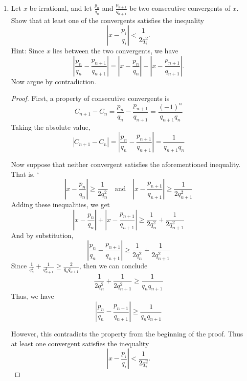 \documentclass[11pt]{article}
\theoremstyle{definition}
\begin{document}
\begin{enumerate}
\begin{enumerate}
\begin{proof}
            So, one solution is $(x_2, y_2) = (449,120)$

            For $n=3$:
            \begin{align*}
                (15+4\sqrt{14})^3 &= (449 + 120\sqrt{14})(15+4\sqrt{14}) \\
                &= 6735 + 3596\sqrt{14} + 6720 \\
                &= 13455 + 3596\sqrt{14}
            \end{align*}
            So, another solution is $(x_3, y_3) = (13455,3596)$
        \end{proof}
    
    \end{enumerate}
    \item Let $x$ be irrational, and let $\frac{p_n}{q_n}$ and $\frac{p_{n+1}}{q_{n+1}}$ be two consecutive convergents of $x$. Show that at least one of the convergents satisfies the inequality
    $$ \left\lvert x - \frac{p_i}{q_i} \right\rvert < \frac{1}{2q_i^2}. $$ Hint: Since $x$ lies between the two convergents, we have $$\left\lvert \frac{p_n}{q_n} - \frac{p_{n+1}}{q_{n+1}} \right\rvert = \left\lvert x - \frac{p_n}{q_n} \right\rvert + \left\lvert x - \frac{p_{n+1}}{q_{n+1}} \right\rvert.$$ Now argue by contradiction.
    \begin{proof}
        First, a property of consecutive convergents is 
        \[
            C_{n+1} - C_n = \frac{p_n}{q_n} - \frac{p_{n+1}}{q_{n+1}} = \frac{(-1)^n}{q_{n+1}q_n}
        \]
        Taking the absolute value, 
        \[
            \left\lvert C_{n+1} - C_n \right\rvert = \left\lvert \frac{p_n}{q_n} - \frac{p_{n+1}}{q_{n+1}} \right\rvert = \frac{1}{q_{n+1}q_n}
        \]

        Now suppose that neither convergent satisfies the aforementioned inequality. That is, 
    `   \[
            \left\lvert x - \frac{p_n}{q_n} \right\rvert \ge \frac{1}{2q_n^2} \quad\text{and}\quad \left\lvert x - \frac{p_{n+1}}{q_{n+1}} \right\rvert \ge \frac{1}{2q_{n+1}^2}
        \]
        Adding these inequalities, we get 
        \[
            \left\lvert x - \frac{p_n}{q_n} \right\rvert + \left\lvert x - \frac{p_{n+1}}{q_{n+1}} \right\rvert \ge \frac{1}{2q_n^2} + \frac{1}{2q_{n+1}^2} 
        \]
        And by substitution, 
        \[
            \left\lvert \frac{p_n}{q_n} - \frac{p_{n+1}}{q_{n+1}} \right\rvert \ge \frac{1}{2q_n^2} + \frac{1}{2q_{n+1}^2}
        \]
        Since $\frac{1}{q_n^2} + \frac{1}{q_{n+1}^2} \ge \frac{2}{q_nq_{n+1}}$, then we can conclude
        \[
            \frac{1}{2q_n^2} + \frac{1}{2q_{n+1}^2} \ge \frac{1}{q_nq_{n+1}}
        \]
        Thus, we have 
        \[
            \left\lvert \frac{p_n}{q_n} - \frac{p_{n+1}}{q_{n+1}} \right\rvert \ge \frac{1}{q_nq_{n+1}}
        \]

        However, this contradicts the property from the beginning of the proof. 
        Thus at least one convergent satisfies the inequality
        $$ \left\lvert x - \frac{p_i}{q_i} \right\rvert < \frac{1}{2q_i^2}. $$
    \end{proof}

\end{enumerate}
\end{document}
